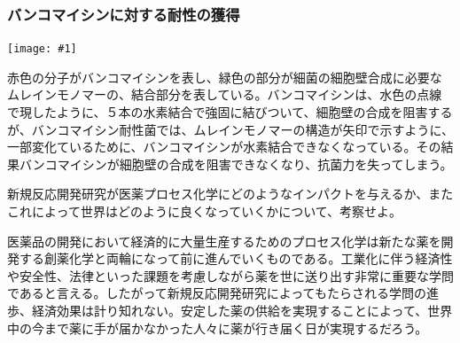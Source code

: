 \documentclass[a4paper,papersize,dvipdfmx]{jsarticle}
\newcommand{\pict}[2]{\begin{center} \texttt{[image: \#1]} \end{center}}   %
\begin{document}
\subsubsection*{バンコマイシンに対する耐性の獲得}
\pict{imgs-k/tsk.png}{10}
赤色の分子がバンコマイシンを表し、緑色の部分が細菌の細胞壁合成に必要なムレインモノマーの、結合部分を表している。バンコマイシンは、水色の点線で現したように、５本の水素結合で強固に結びついて、細胞壁の合成を阻害するが、バンコマイシン耐性菌では、ムレインモノマーの構造が矢印で示すように、一部変化ているために、バンコマイシンが水素結合できなくなっている。その結果バンコマイシンが細胞壁の合成を阻害できなくなり、抗菌力を失ってしまう。

\begin{tcolorbox}[colback=white,colbacktitle=black,coltitle=white,title={5.}]
新規反応開発研究が医薬プロセス化学にどのようなインパクトを与えるか、またこれによって世界はどのように良くなっていくかについて、考察せよ。
\end{tcolorbox}


医薬品の開発において経済的に大量生産するためのプロセス化学は新たな薬を開発する創薬化学と両輪になって前に進んでいくものである。工業化に伴う経済性や安全性、法律といった課題を考慮しながら薬を世に送り出す非常に重要な学問であると言える。したがって新規反応開発研究によってもたらされる学問の進歩、経済効果は計り知れない。安定した薬の供給を実現することによって、世界中の今まで薬に手が届かなかった人々に薬が行き届く日が実現するだろう。
\end{document}
